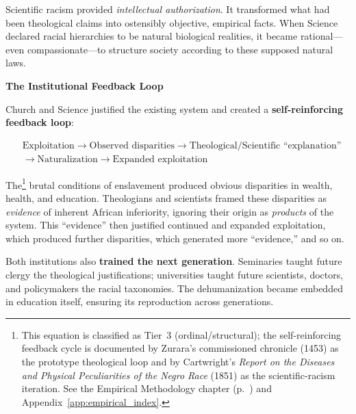 Scientific racism provided \textit{intellectual authorization}. It transformed what had been theological claims into ostensibly objective, empirical facts. When Science declared racial hierarchies to be natural biological realities, it became rational---even compassionate---to structure society according to these supposed natural laws.

\textbf{The Institutional Feedback Loop}

Church and Science justified the existing system and created a \textbf{self-reinforcing feedback loop}:

\begin{equation}\label{eq:2.8-church-science-feedback-loop}
\begin{aligned}
&\text{Exploitation} \rightarrow \text{Observed disparities} \rightarrow \text{Theological/Scientific ``explanation''} \\
&\rightarrow \text{Naturalization} \rightarrow \text{Expanded exploitation}
\end{aligned}
\end{equation}

The\footnote{This equation is classified as Tier~3 (ordinal/structural); the self-reinforcing feedback cycle is documented by Zurara's commissioned chronicle (1453) \cite{zurara} as the prototype theological loop and by Cartwright's \textit{Report on the Diseases and Physical Peculiarities of the Negro Race} (1851) as the scientific-racism iteration. See the Empirical Methodology chapter (p.~\pageref{ch:empirical_methodology}) and Appendix~\ref{app:empirical_index}.} brutal conditions of enslavement produced obvious disparities in wealth, health, and education. Theologians and scientists framed these disparities as \textit{evidence} of inherent African inferiority, ignoring their origin as \textit{products} of the system. This ``evidence'' then justified continued and expanded exploitation, which produced further disparities, which generated more ``evidence,'' and so on.

Both institutions also \textbf{trained the next generation}. Seminaries taught future clergy the theological justifications; universities taught future scientists, doctors, and policymakers the racial taxonomies. The dehumanization became embedded in education itself, ensuring its reproduction across generations.

